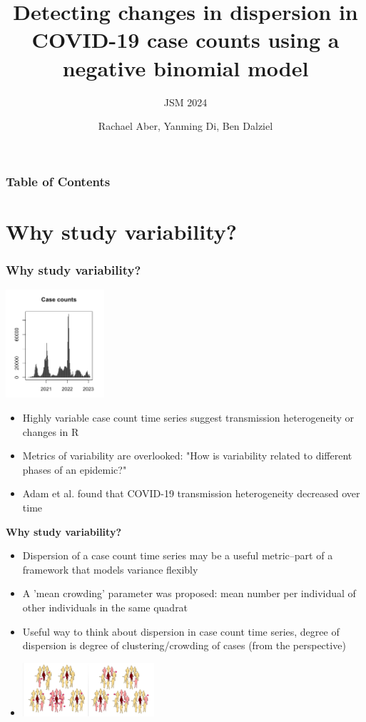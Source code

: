 \documentclass{beamer}
\title{\textbf{Detecting changes in dispersion in COVID-19 case counts using a negative binomial model}}
\subtitle{JSM 2024}
\author{Rachael Aber, Yanming Di, Ben Dalziel}
\begin{document}
\frame{\titlepage}

\begin{frame}
	\frametitle{Table of Contents}
	\tableofcontents
\end{frame}

\section{Why study variability?}
	
\begin{frame}
\frametitle{Why study variability?}
\includegraphics[height=4cm]{var}
\begin{itemize}[<+-| alert@+>] %
			\item Highly variable case count time series suggest transmission heterogeneity or changes in R
			\item Metrics of variability are overlooked: "How is variability related to different phases of an epidemic?"\cite{graham_measles_2019}
			\item Adam et al.\cite{adam_time-varying_2022} found that COVID-19 transmission heterogeneity decreased over time
	\end{itemize}
\end{frame}

\begin{frame}{\textbf{Why study variability?}}
	\begin{itemize}[<+-| alert@+>] 
		\item Dispersion of a case count time series may be a useful metric--part of a framework that models variance flexibly
		\item A 'mean crowding' parameter \cite{lloyd_mean_1967} was proposed: mean number per individual of other individuals in the same quadrat 
		\item Useful way to think about dispersion in case count time series, degree of dispersion is degree of clustering/crowding of cases (from the perspective)
		\item \includegraphics[height=2cm]{sup}
	\end{itemize}
\end{frame}
\end{document}
